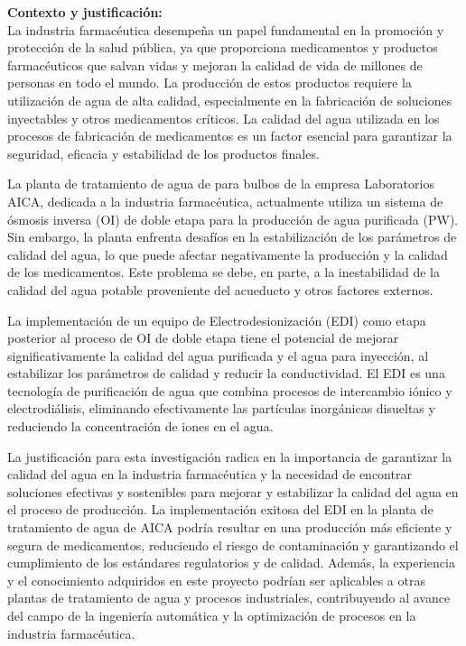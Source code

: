 \textbf{Contexto y justificación:}\\
La industria farmacéutica desempeña un papel fundamental en la promoción y protección de la salud pública, ya que proporciona medicamentos y productos farmacéuticos que salvan vidas y mejoran la calidad de vida de millones de personas en todo el mundo. La producción de estos productos requiere la utilización de agua de alta calidad, especialmente en la fabricación de soluciones inyectables y otros medicamentos críticos. La calidad del agua utilizada en los procesos de fabricación de medicamentos es un factor esencial para garantizar la seguridad, eficacia y estabilidad de los productos finales.

La planta de tratamiento de agua de para bulbos de la empresa Laboratorios AICA, dedicada a la industria farmacéutica, actualmente utiliza un sistema de ósmosis inversa (OI) de doble etapa para la producción de agua purificada (PW). Sin embargo, la planta enfrenta desafíos en la estabilización de los parámetros de calidad del agua, lo que puede afectar negativamente la producción y la calidad de los medicamentos. Este problema se debe, en parte, a la inestabilidad de la calidad del agua potable proveniente del acueducto y otros factores externos.

La implementación de un equipo de Electrodesionización (EDI) como etapa posterior al proceso de OI de doble etapa tiene el potencial de mejorar significativamente la calidad del agua purificada y el agua para inyección, al estabilizar los parámetros de calidad y reducir la conductividad. El EDI es una tecnología de purificación de agua que combina procesos de intercambio iónico y electrodiálisis, eliminando efectivamente las partículas inorgánicas disueltas y reduciendo la concentración de iones en el agua.

La justificación para esta investigación radica en la importancia de garantizar la calidad del agua en la industria farmacéutica y la necesidad de encontrar soluciones efectivas y sostenibles para mejorar y estabilizar la calidad del agua en el proceso de producción. La implementación exitosa del EDI en la planta de tratamiento de agua de AICA podría resultar en una producción más eficiente y segura de medicamentos, reduciendo el riesgo de contaminación y garantizando el cumplimiento de los estándares regulatorios y de calidad. Además, la experiencia y el conocimiento adquiridos en este proyecto podrían ser aplicables a otras plantas de tratamiento de agua y procesos industriales, contribuyendo al avance del campo de la ingeniería automática y la optimización de procesos en la industria farmacéutica.


